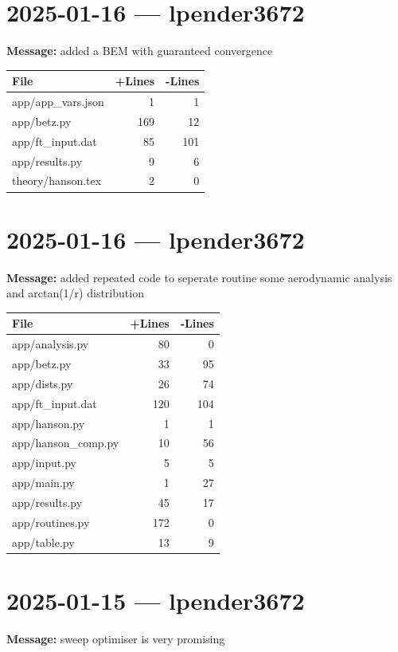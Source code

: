 \documentclass{article}
\begin{document}
\section*{2025-01-16 --- lpender3672}
\textbf{Message:} added a BEM with guaranteed convergence

\begin{longtable}{|p{10cm}|r|r|}
\hline \textbf{File} & \textbf{+Lines} & \textbf{-Lines} \\
\hline
app/app\_vars.json & 1 & 1 \\
\hline
app/betz.py & 169 & 12 \\
\hline
app/ft\_input.dat & 85 & 101 \\
\hline
app/results.py & 9 & 6 \\
\hline
theory/hanson.tex & 2 & 0 \\
\hline
\end{longtable}

\section*{2025-01-16 --- lpender3672}
\textbf{Message:} added repeated code to seperate routine some aerodynamic analysis and arctan(1/r) distribution

\begin{longtable}{|p{10cm}|r|r|}
\hline \textbf{File} & \textbf{+Lines} & \textbf{-Lines} \\
\hline
app/analysis.py & 80 & 0 \\
\hline
app/betz.py & 33 & 95 \\
\hline
app/dists.py & 26 & 74 \\
\hline
app/ft\_input.dat & 120 & 104 \\
\hline
app/hanson.py & 1 & 1 \\
\hline
app/hanson\_comp.py & 10 & 56 \\
\hline
app/input.py & 5 & 5 \\
\hline
app/main.py & 1 & 27 \\
\hline
app/results.py & 45 & 17 \\
\hline
app/routines.py & 172 & 0 \\
\hline
app/table.py & 13 & 9 \\
\hline
\end{longtable}

\section*{2025-01-15 --- lpender3672}
\textbf{Message:} sweep optimiser is very promising
\end{document}

